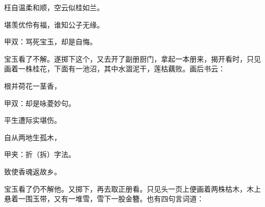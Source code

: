 \begin{poem}
    \begin{pl}枉自温柔和顺，空云似桂如兰。\end{pl}

    \begin{pl}堪羡优伶有福，谁知公子无缘。\end{pl}

    \begin{note}甲双：骂死宝玉，却是自悔。\end{note}

\end{poem}

\begin{parag}

    宝玉看了不解。遂掷下这个，又去开了副册厨门，拿起一本册来，揭开看时，只见画着一株桂花，下面有一池沼，其中水涸泥干，莲枯藕败。画后书云：
\end{parag}

\begin{poem}
    \begin{pl}根并荷花一茎香，\end{pl} \begin{note}甲双：却是咏菱妙句。\end{note}

    \begin{pl}平生遭际实堪伤。\end{pl}

    \begin{pl}自从两地生孤木，\end{pl} \begin{note}甲夹：折（拆）字法。\end{note}

    \begin{pl}致使香魂返故乡。\end{pl}
\end{poem}

\begin{parag}

    宝玉看了仍不解他。又掷下，再去取正册看。只见头一页上便画着两株枯木，木上悬着一围玉带，又有一堆雪，雪下一股金簪。也有四句言词道：
\end{parag}


